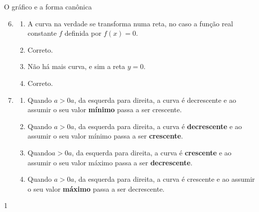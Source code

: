\begin{answer}{O gráfico e a forma canônica}
{
\begin{enumerate}\setcounter{enumi}{5}
\item {} 
\begin{enumerate}[label=\titem{\roman*)}]
\item A curva na verdade se transforma numa reta, no caso a função real constante \(f\) definida por \(f(x)=0\).

\item Correto.

\item Não há mais curva, e sim a reta \(y=0\).

\item Correto.
\end{enumerate}

\item {} 
\begin{enumerate}[label=\titem{\roman*)}]
\item Quando $a>0a$, da esquerda para direita, a curva é decrescente e ao assumir o seu valor \textbf{mínimo} passa a ser crescente.

\item Quando $a>0a$, da esquerda para direita, a curva é \textbf{decrescente} e ao assumir o seu valor mínimo passa a ser \textbf{crescente}.

\item Quando$a>0a$, da esquerda para direita, a curva é \textbf{crescente} e ao assumir o seu valor máximo passa a ser \textbf{decrescente}.

\item Quando $a>0a$, da esquerda para direita, a curva é crescente e ao assumir o seu valor \textbf{máximo} passa a ser decrescente.
\end{enumerate}
\end{enumerate}
}{1}
\end{answer}
\clearmargin
\marginpar{\vspace{.5em}}

